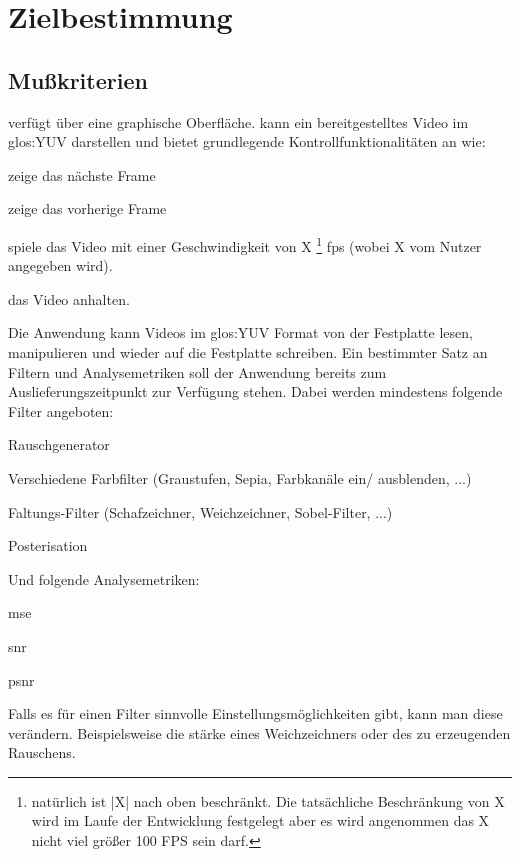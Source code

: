 \chapter{Zielbestimmung}

\section{Mußkriterien}
\setcounter{counterKriterien}{0}
 \projektTitel verfügt über eine graphische Oberfläche.
 \projektTitel kann ein bereitgestelltes Video im \gls{glos:YUV} darstellen und bietet grundlegende Kontrollfunktionalitäten an wie:
\begin{compactitem}
\item zeige das nächste Frame
\item zeige das vorherige Frame
\item spiele das Video mit einer Geschwindigkeit von X \footnote{ natürlich ist |X| nach oben beschränkt. Die tatsächliche Beschränkung von X wird im Laufe der Entwicklung festgelegt aber es wird angenommen das X nicht viel größer 100 FPS sein darf.} \gls{fps} (wobei X vom Nutzer angegeben wird).
\item das Video anhalten.
\end{compactitem} 
 Die Anwendung kann Videos im \gls{glos:YUV} Format von der Festplatte lesen, manipulieren und wieder auf die Festplatte schreiben.
 Ein bestimmter Satz an Filtern und Analysemetriken soll der Anwendung bereits zum Auslieferungszeitpunkt zur Verfügung stehen. 
Dabei werden mindestens folgende Filter angeboten:
\begin{compactitem}
\item Rauschgenerator
\item Verschiedene Farbfilter (Graustufen, Sepia, Farbkanäle ein/ ausblenden, ...)
\item Faltungs-Filter (Schafzeichner, Weichzeichner, Sobel-Filter, ...)
\item Posterisation
\end{compactitem}
Und folgende Analysemetriken:
\begin{compactitem}
\item \gls{mse}
\item \gls{snr}
\item \gls{psnr}
\end{compactitem}
 Falls es für einen Filter sinnvolle Einstellungsmöglichkeiten gibt, kann man diese verändern. Beispielsweise die stärke eines Weichzeichners oder des zu erzeugenden Rauschens.
